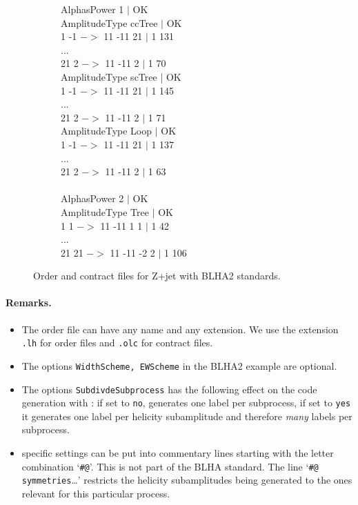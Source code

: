 \begin{figure}[h]
\begin{subfigure}[]{0.49\textwidth}
{{AlphasPower 1 $|$ OK\\
AmplitudeType ccTree $|$ OK\\
1 -1 $->$ 11 -11 21 $|$ 1 131\\
...\\
21 2 $->$ 11 -11 2 $|$ 1 70\\
AmplitudeType scTree | OK\\
1 -1 $->$ 11 -11 21 $|$ 1 145\\
...\\
21 2 $->$ 11 -11 2 $|$ 1 71\\
AmplitudeType Loop $|$ OK\\
1 -1 $->$ 11 -11 21 $|$ 1 137\\
...\\
21 2 $->$ 11 -11 2 $|$ 1 63\\
\\
AlphasPower 2 $|$ OK\\
AmplitudeType Tree $|$ OK\\
1 1 $->$ 11 -11 1 1 $|$ 1 42\\
...\\
21 21 $->$ 11 -11 -2 2 $|$ 1 106\\}
}
\end{subfigure}
\caption{Order and contract files for Z+jet with BLHA2 standards.}
\label{fig:BLHA2}
\end{figure}  

\paragraph{Remarks.}
\begin{itemize}
\item The order file can have any name and any extension.
      We use  the extension \texttt{.lh}
      for order files and \texttt{.olc} for contract files.
\item The options \texttt{WidthScheme, EWScheme} in the BLHA2  example are optional.
\item The options \texttt{SubdivdeSubprocess}  has the following effect
      on the code generation with \gosam{}: if set to 
      \texttt{no}, \gosam{} generates one label per subprocess, if set to
      \texttt{yes} it generates one label per helicity subamplitude
      and therefore \emph{many} labels per subprocess.
      
\item \gosam{} specific settings can be put into commentary lines starting
      with the letter combination `\texttt{\#@}'. This is not part of the
      BLHA standard. The line `\texttt{\#@ symmetries}\dots' restricts the
      helicity subamplitudes being generated to the ones relevant for this
      particular process. 
\end{itemize}

